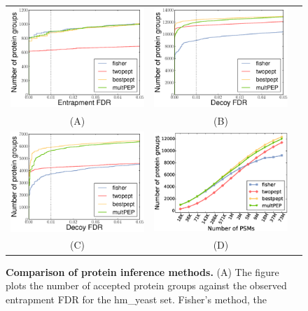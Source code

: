 \documentclass{article}
\begin{document}
\begin{figure}
\centering
\begin{tabular}{ccc}
\includegraphics[width=0.45\linewidth]
{./img/unique-pept-performance} &
\includegraphics[width=0.45\linewidth]
{./img/kim-swissprot-performance}\\
(A) & (B)\\
\includegraphics[width=0.45\linewidth]
{./img/kim-uniprot-performance} &
\includegraphics[width=0.45\linewidth]
{./img/kim-downsampling-performance}\\
(C) & (D)
\end{tabular}
  \caption{{\bf Comparison of protein inference methods.} (A) The
figure plots the number of accepted protein groups against the
observed entrapment FDR for the hm\_yeast set. Fisher's method, the
}
\end{figure}
\end{document}
